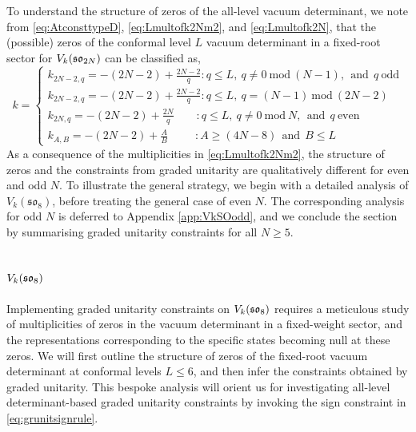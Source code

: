 To understand the structure of zeros of the all-level vacuum determinant, we note from \eqref{eq:AtconsttypeD}, \eqref{eq:Lmultofk2Nm2}, and \eqref{eq:Lmultofk2N}, that the (possible) zeros of the conformal level $L$ vacuum determinant in a fixed-root sector for $V_k(\mathfrak{so}_{2N})$ can be classified as,
\begin{equation} \label{eq: so2nprelimzero}
    k = \begin{cases}
        k_{2N-2,q} = -(2N-2) + \frac{2N-2}{q}: q \leqslant L, \ q \neq 0~\mathrm{mod}~(N-1), \ \ \text{and} \ \ q \ \mathrm{odd} \\ 
        k_{2N-2,q} = -(2N-2) + \frac{2N-2}{q}: q \leqslant L, \ q = (N-1)~\mathrm{mod}~(2N-2) \\
        k_{2N,q} = -(2N-2) + \frac{2N}{q} \qquad: q \leqslant L, \ q \neq 0~\mathrm{mod}~N, \ \ \text{and} \ \ q \ \mathrm{even} \\
        k_{A,B} = -(2N-2) + \frac{A}{B} \qquad \ \ : A \geqslant (4N-8) \ \ \text{and} \ \ B \leqslant L
    \end{cases}
\end{equation}
As a consequence of the multiplicities in \eqref{eq:Lmultofk2Nm2}, the structure of zeros and the constraints from graded unitarity are qualitatively different for even and odd $N$. To illustrate the general strategy, we begin with a detailed analysis of $V_k(\mathfrak{so}_8)$, before treating the general case of even $N$. The corresponding analysis for odd $N$ is deferred to Appendix \ref{app:VkSOodd}, and we conclude the section by summarising graded unitarity constraints for all $N \geqslant 5$. 

\subsection{$V_k(\mathfrak{so}_8)$}
Implementing graded unitarity constraints on $V_k(\mathfrak{so}_8)$ requires a meticulous study of multiplicities of zeros in the vacuum determinant in a fixed-weight sector, and the representations corresponding to the specific states becoming null at these zeros. We will first outline the structure of zeros of the fixed-root vacuum determinant at conformal levels $L \leqslant 6$, and then infer the constraints obtained by graded unitarity. This bespoke analysis will orient us for investigating all-level determinant-based graded unitarity constraints by invoking the sign constraint in \eqref{eq:grunitsignrule}.

